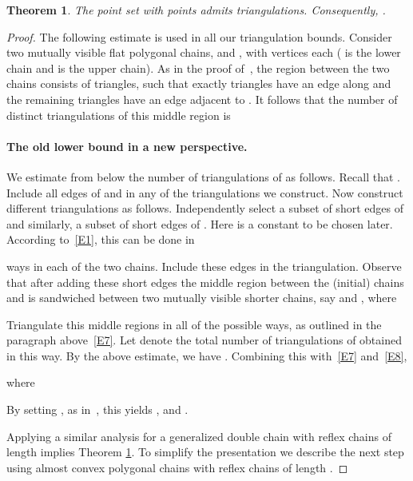\documentclass[11pt]{article}
\newtheorem{theorem}{Theorem}
\begin{document}
\begin{theorem} \label{T1}
The point set  with  points admits  triangulations.
Consequently, .
\end{theorem}
\begin{proof}
The following estimate is used in all our triangulation bounds.
Consider two mutually visible flat polygonal chains,  and , with 
vertices each ( is the lower chain and  is the upper chain). As
in the proof of~\cite[Theorem 4.1]{GNT00}, the region between the two
chains consists of  triangles, such that exactly  triangles
have an edge along  and the remaining  triangles have an edge adjacent to .
It follows that the number of distinct triangulations of this middle region is


\paragraph{The old  lower bound in a new perspective.}
We estimate from below the number of triangulations of  as
follows. Recall that . Include all edges of  and 
in any of the triangulations we construct.
Now construct different triangulations as follows. Independently
select a subset of  short edges of  and
similarly, a subset of  short edges of . Here
 is a constant to be chosen later.
According to~\eqref{E1}, this can be done in

ways in each of the two chains. Include these edges in the triangulation.
Observe that after adding these short edges the middle region between
the (initial) chains  and  is sandwiched between two
mutually visible shorter chains, say  and , where

Triangulate this middle regions in all of the possible ways,
as outlined in the paragraph above~\eqref{E7}. Let 
denote the total number of triangulations of  obtained in this way.
By the above estimate, we have .
Combining this with~\eqref{E7} and~\eqref{E8},

where

By setting , as in~\cite{AHV+06}, this yields
, and .

Applying a similar analysis for a generalized double chain with reflex chains of length
 implies Theorem \ref{T1}.
To simplify the presentation we describe the next step
using almost convex polygonal chains with reflex chains of length .

\end{proof}
\end{document}
